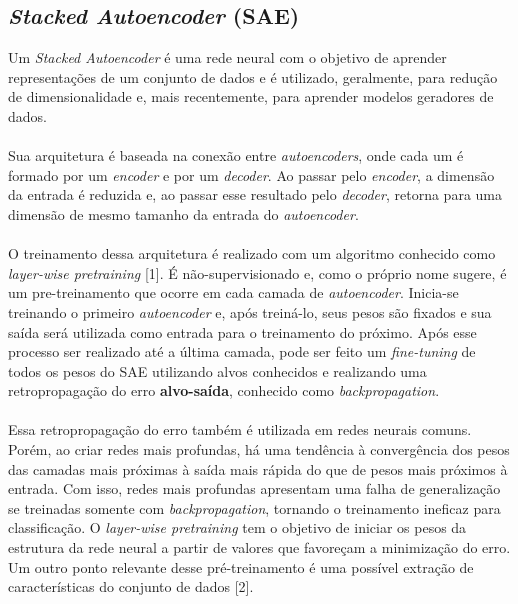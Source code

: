 \documentclass[]{report}
\begin{document}
	\subsection*{\textit{Stacked Autoencoder} (SAE)}
	Um \textit{Stacked Autoencoder} é uma rede neural com o objetivo de aprender representações de um conjunto de dados e é utilizado, geralmente, para redução de dimensionalidade e, mais recentemente, para aprender modelos geradores de dados.\\\\
	Sua arquitetura é baseada na conexão entre \textit{autoencoders}, onde cada um é formado por um \textit{encoder} e por um \textit{decoder}. Ao passar pelo \textit{encoder}, a dimensão da entrada é reduzida e, ao passar esse resultado pelo \textit{decoder}, retorna para uma dimensão de mesmo tamanho da entrada do \textit{autoencoder}.\\\\
	O treinamento dessa arquitetura é realizado com um algoritmo conhecido como \textit{layer-wise pretraining} [1]. É não-supervisionado e, como o próprio nome sugere, é um pre-treinamento que ocorre em cada camada de \textit{autoencoder}. Inicia-se treinando o primeiro \textit{autoencoder} e, após treiná-lo, seus pesos são fixados e sua saída será utilizada como entrada para o treinamento do próximo. Após esse processo ser realizado até a última camada, pode ser feito um \textit{fine-tuning} de todos os pesos do SAE utilizando alvos conhecidos e realizando uma retropropagação do erro \textbf{alvo-saída}, conhecido como \textit{backpropagation}.\\\\
	Essa retropropagação do erro também é utilizada em redes neurais comuns. Porém, ao criar redes mais profundas, há uma tendência à convergência dos pesos das camadas mais próximas à saída mais rápida do que de pesos mais próximos à entrada. Com isso, redes mais profundas apresentam uma falha de generalização se treinadas somente com \textit{backpropagation}, tornando o treinamento ineficaz para classificação. O \textit{layer-wise pretraining} tem o objetivo de iniciar os pesos da estrutura da rede neural a partir de valores que favoreçam a minimização do erro. Um outro ponto relevante desse pré-treinamento é uma possível extração de características do conjunto de dados [2].
\end{document}
